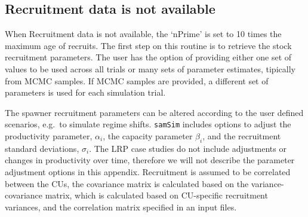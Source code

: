\documentclass[11pt]{book}
\begin{document}
\hypertarget{recruitment-data-is-not-available}{%
\subsection{Recruitment data is not available}\label{recruitment-data-is-not-available}}

When Recruitment data is not available, the `nPrime' is set to 10 times the maximum age of recruits. The first step on this routine is to retrieve the stock recruitment parameters. The user has the option of providing either one set of values to be used across all trials or many sets of parameter estimates, tipically from MCMC samples. If MCMC samples are provided, a different set of parameters is used for each simulation trial.

The spawner recruitment parameters can be altered according to the user defined scenarios, e.g.~to simulate regime shifts. \texttt{samSim} includes options to adjust the productivity parameter, \(\alpha_{i}\), the capacity parameter \(\beta_{i}\), and the recruitment standard deviations, \(\sigma_{i}\). The LRP case studies do not include adjustments or changes in productivity over time, therefore we will not describe the parameter adjustment options in this appendix. Recruitment is assumed to be correlated between the CUs, the covariance matrix is calculated based on the variance-covariance matrix, which is calculated based on CU-specific recruitment variances, and the correlation matrix specified in an input files.
\end{document}
